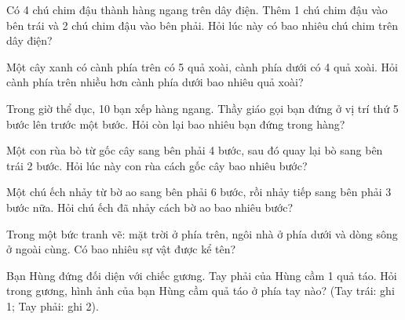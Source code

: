 \begin{ex}
Có 4 chú chim đậu thành hàng ngang trên dây điện. Thêm 1 chú chim đậu vào bên trái và 2 chú chim đậu vào bên phải. Hỏi lúc này có bao nhiêu chú chim trên dây điện?
\end{ex}

\begin{ex}
Một cây xanh có cành phía trên có 5 quả xoài, cành phía dưới có 4 quả xoài. Hỏi cành phía trên nhiều hơn cành phía dưới bao nhiêu quả xoài?
\end{ex}

\begin{ex}
Trong giờ thể dục, 10 bạn xếp hàng ngang. Thầy giáo gọi bạn đứng ở vị trí thứ 5 bước lên trước một bước. Hỏi còn lại bao nhiêu bạn đứng trong hàng?
\end{ex}

\begin{ex}
Một con rùa bò từ gốc cây sang bên phải 4 bước, sau đó quay lại bò sang bên trái 2 bước. Hỏi lúc này con rùa cách gốc cây bao nhiêu bước?
\end{ex}

\begin{ex}
Một chú ếch nhảy từ bờ ao sang bên phải 6 bước, rồi nhảy tiếp sang bên phải 3 bước nữa. Hỏi chú ếch đã nhảy cách bờ ao bao nhiêu bước?
\end{ex}

\begin{ex}
Trong một bức tranh vẽ: mặt trời ở phía trên, ngôi nhà ở phía dưới và dòng sông ở ngoài cùng. Có bao nhiêu sự vật được kể tên?
\end{ex}

\begin{ex}
Bạn Hùng đứng đối diện với chiếc gương. Tay phải của Hùng cầm 1 quả táo. Hỏi trong gương, hình ảnh của bạn Hùng cầm quả táo ở phía tay nào? (Tay trái: ghi 1; Tay phải: ghi 2).
\end{ex}

